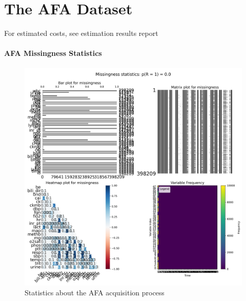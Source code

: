 \usepackage{longtable}\section{The AFA Dataset}
For estimated costs, see estimation results report\paragraph{AFA Missingness Statistics}
\begin{figure}\centering\includegraphics[width=0.5 \textwidth]{img/MI-simple_missingness_stats.png}\caption{Statistics about the AFA acquisition process}\label{fig:img/MI-simple_missingness_stats.png}\end{figure}